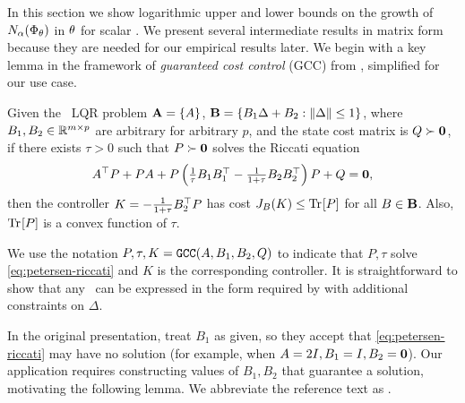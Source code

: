\label{sec:results-scalar}


In this section we show logarithmic upper and lower bounds on
the growth of $N_{\alpha}(\Phi_\theta)$ in $\theta$
for scalar \DDFproblems.
We present several intermediate results in matrix form because they are needed for our empirical results later.
We begin with a key lemma in the framework of
\emph{guaranteed cost control} (GCC)
from \citet{petersen-guaranteed-cost},
simplified for our use case.

\begin{lemma}
\label{lem:petersen-gcc}
	Given the \multienv\ LQR problem
		$\mathbf{A} = \{ A \}$,
		$\mathbf{B} = \{ B_1 \Delta + B_2 : \lVert\Delta\rVert \leq 1 \}$,
	where $B_1, B_2 \in \mathbb{R}^{m \times p}$ are arbitrary for arbitrary $p$,
	and the state cost matrix is $Q \succ \mathbf{0}$,
	if there exists $\tau > 0$ such that $P \succ \mathbf{0}$ solves the Riccati equation
	\begin{equation}
	\label{eq:petersen-riccati}
		A^\top P + P A
		+ P \left(
			\textstyle \frac{1}{\tau} B_1 B_1^\top - \frac{1}{1+\tau} B_2 B_2^\top
		\right) P
		+ Q = \mathbf{0},
	\end{equation}
	then the controller
	\(
		K = -\frac{1}{1 + \tau} B_2^\top P
	\)
	has cost $J_B(K) \leq \mathrm{Tr} \hspace{-1pt} \left[ P \right]$
	for all $B \in \mathbf{B}$.
	Also, $\mathrm{Tr} \hspace{-1pt} \left[ P \right]$ is a convex function of $\tau$.
\end{lemma}



We use the notation
\(
	P, \tau, K = {\normalfont \texttt{GCC}}(A, B_1, B_2, Q)
\)
to indicate that $P, \tau$ solve
\eqref{eq:petersen-riccati}
and $K$ is the corresponding controller.
It is straightforward to show that any \DDFproblem\
can be expressed in the form required by 
with additional constraints on $\Delta$.

In the original presentation, \citet{petersen-guaranteed-cost} treat $B_1$ as given,
so they accept that
\eqref{eq:petersen-riccati} may have no solution
(for example, when $A = 2I, B_1 = I, B_2 = \mathbf{0}$).
Our application requires constructing values of $B_1, B_2$ that guarantee a solution,
motivating the following lemma.
We abbreviate the reference text \citet{lancaster-AREs} as .



